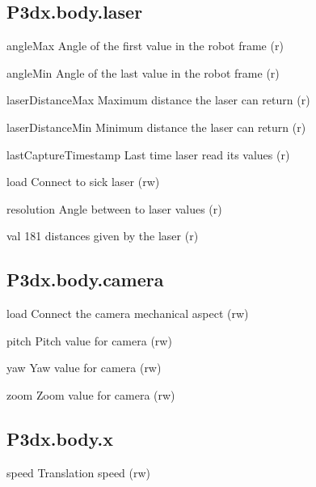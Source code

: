 \subsection{P3dx.body.laser}

\begin{urbiscriptapi}
\item[angleMax] Angle of the first value in the robot frame (r)


\item[angleMin] Angle of the last value in the robot frame (r)


\item[laserDistanceMax] Maximum distance the laser can return (r)


\item[laserDistanceMin] Minimum distance the laser can return (r)


\item[lastCaptureTimestamp] Last time laser read its values (r)


\item[load] Connect to sick laser (rw)


\item[resolution] Angle between to laser values (r)


\item[val] 181 distances given by the laser (r)
\end{urbiscriptapi}


\subsection{P3dx.body.camera}

\begin{urbiscriptapi}
\item[load] Connect the camera mechanical aspect (rw)


\item[pitch] Pitch value for camera (rw)


\item[yaw] Yaw value for camera (rw)


\item[zoom] Zoom value for camera (rw)
\end{urbiscriptapi}

\subsection{P3dx.body.x}
\begin{urbiscriptapi}
\item[speed] Translation speed (rw)
\end{urbiscriptapi}

